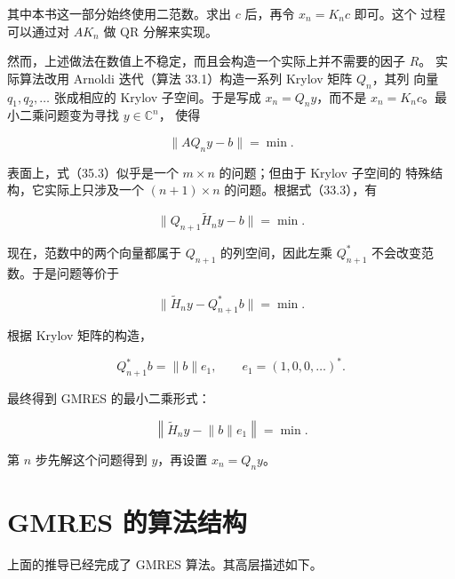 \documentclass[UTF8,fontset=none,12pt]{ctexart}
\begin{document}
其中本书这一部分始终使用二范数。求出 $c$ 后，再令 $x_n=K_nc$ 即可。这个
过程可以通过对 $AK_n$ 做 QR 分解来实现。

然而，上述做法在数值上不稳定，而且会构造一个实际上并不需要的因子 $R$。
实际算法改用 Arnoldi 迭代（算法 33.1）构造一系列 Krylov 矩阵 $Q_n$，其列
向量 $q_1,q_2,\ldots$ 张成相应的 Krylov 子空间。于是写成
$x_n=Q_ny$，而不是 $x_n=K_nc$。最小二乘问题变为寻找 $y\in\mathbb C^n$，
使得

\begin{equation}
\lVert AQ_ny-b\rVert=\min.
\tag{35.3}
\end{equation}

表面上，式（35.3）似乎是一个 $m\times n$ 的问题；但由于 Krylov 子空间的
特殊结构，它实际上只涉及一个 $(n+1)\times n$ 的问题。根据式（33.3），有

\begin{equation}
\lVert Q_{n+1}\widetilde H_ny-b\rVert=\min.
\tag{35.4}
\end{equation}

现在，范数中的两个向量都属于 $Q_{n+1}$ 的列空间，因此左乘
$Q_{n+1}^*$ 不会改变范数。于是问题等价于

\begin{equation}
\lVert \widetilde H_ny-Q_{n+1}^*b\rVert=\min.
\tag{35.5}
\end{equation}

根据 Krylov 矩阵的构造，

\[
Q_{n+1}^*b=\lVert b\rVert e_1,
\qquad e_1=(1,0,0,\ldots)^*.
\]

最终得到 GMRES 的最小二乘形式：

\begin{equation}
\left\lVert \widetilde H_ny-\lVert b\rVert e_1\right\rVert=\min.
\tag{35.6}
\end{equation}

第 $n$ 步先解这个问题得到 $y$，再设置 $x_n=Q_ny$。

\section*{GMRES 的算法结构}

上面的推导已经完成了 GMRES 算法。其高层描述如下。
\end{document}
